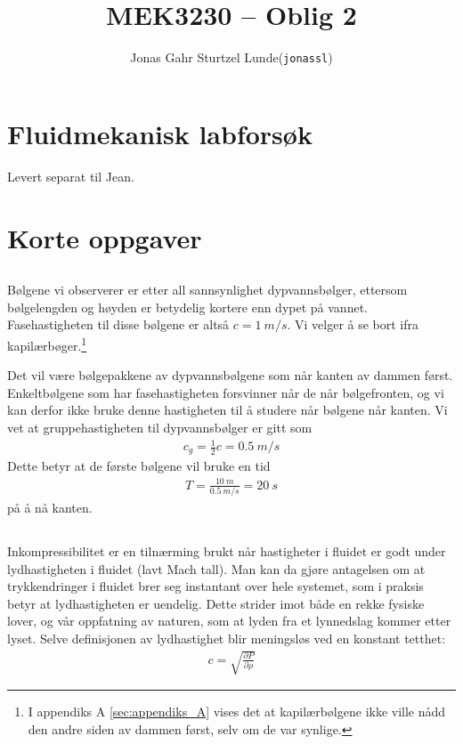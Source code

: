 \documentclass[12p,a4paper]{article}
\newcommand{\half}{\frac{1}{2}}
\begin{document}
\title{MEK3230 -- Oblig 2}
\author{
    \begin{tabular}{r l}
        Jonas Gahr Sturtzel Lunde & (\texttt{jonassl})
    \end{tabular}}
\maketitle
\section{Fluidmekanisk labforsøk}
Levert separat til Jean.


\section{Korte oppgaver}
\subsection{}\label{sec:2.1}
Bølgene vi observerer er etter all sannsynlighet dypvannsbølger, ettersom bølgelengden og høyden er betydelig kortere enn dypet på vannet. Fasehastigheten til disse bølgene er altså $c=\SI{1}{m/s}$. Vi velger å se bort ifra kapilærbøger.\footnote{I appendiks A \ref{sec:appendiks_A} vises det at kapilærbølgene ikke ville nådd den andre siden av dammen først, selv om de var synlige.}

Det vil være bølgepakkene av dypvannsbølgene som når kanten av dammen først. Enkeltbølgene som har fasehastigheten forsvinner når de når bølgefronten, og vi kan derfor ikke bruke denne hastigheten til å studere når bølgene når kanten. Vi vet at gruppehastigheten til dypvannsbølger er gitt som
\begin{align*}
    c_g = \half c = \SI{0.5}{m/s}
\end{align*}
Dette betyr at de første bølgene vil bruke en tid
\begin{align*}
    T = \frac{\SI{10}{m}}{\SI{0.5}{m/s}} = \SI{20}{s}
\end{align*}
på å nå kanten.


\subsection{}
Inkompressibilitet er en tilnærming brukt når hastigheter i fluidet er godt under lydhastigheten i fluidet (lavt Mach tall). Man kan da gjøre antagelsen om at trykkendringer i fluidet brer seg instantant over hele systemet, som i praksis betyr at lydhastigheten er uendelig. Dette strider imot både en rekke fysiske lover, og vår oppfatning av naturen, som at lyden fra et lynnedslag kommer etter lyset. Selve definisjonen av lydhastighet blir meningsløs ved en konstant tetthet:
\begin{align*}
    c = \sqrt{\frac{\partial P}{\partial \rho}}
\end{align*}
\end{document}
